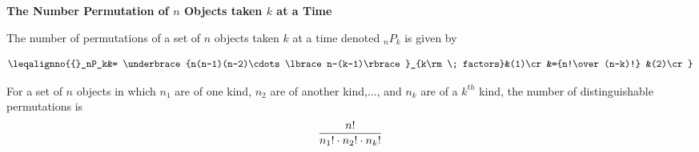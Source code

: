 {\bf The Number Permutation of $n$ Objects taken $k$ at a Time}
\vskip 6pt

The number of permutations of a set of $n$ objects taken $k$ at a time denoted ${}_nP_k$ is given by

$$\leqalignno{{}_nP_k&= \underbrace{n(n-1)(n-2)\cdots \lbrace n-(k-1)\rbrace}_{k\rm\; factors}&(1)\cr
		&={n!\over (n-k)!} &(2)\cr}$$

For a set of $n$ objects in which $n_1$ are of one kind, $n_2$ are of another kind,$\ldots$, and $n_k$ are of a $k^{th}$ kind, the number of distinguishable permutations is $${n!\over n_1!\cdot n_2!\cdot n_k!}$$

\vfill\eject
